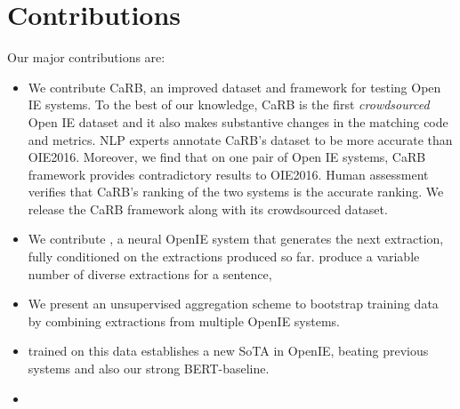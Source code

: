 \section{Contributions}

  Our major contributions are:
  \begin{itemize}
    \item We contribute CaRB, an improved dataset and framework for testing Open IE systems. To the best of our knowledge, CaRB is the first \emph{crowdsourced} Open IE dataset and it also makes substantive changes in the matching code and metrics. NLP experts annotate CaRB's dataset to be more accurate than OIE2016. Moreover, we find that on one  pair of Open IE systems, CaRB framework provides contradictory results to OIE2016. Human assessment verifies that CaRB's ranking of the two systems is the accurate ranking. We release the CaRB framework along with its crowdsourced dataset.

    \item We contribute \shortname{}, a neural OpenIE system that generates the next extraction, fully conditioned on the extractions produced so far. \shortname{} produce a variable number of diverse extractions for a sentence,
    \item We present an unsupervised aggregation scheme to bootstrap training data by combining extractions from multiple OpenIE systems.
    \item \shortname{} trained on this data establishes a new SoTA in OpenIE, beating previous systems and also our strong BERT-baseline. 
    
    \item %
  \end{itemize}

